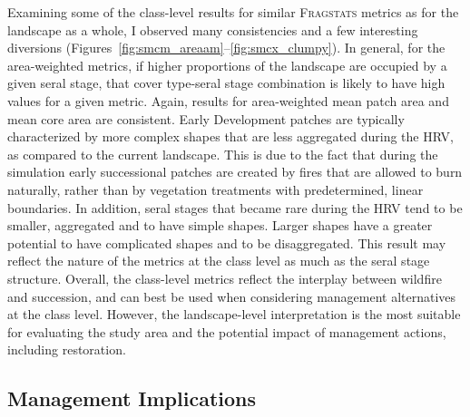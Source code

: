 Examining some of the class-level results for similar \textsc{Fragstats} metrics as for the landscape as a whole, I observed many consistencies and a few interesting diversions (Figures~\ref{fig:smcm_areaam}--\ref{fig:smcx_clumpy}). In general, for the area-weighted metrics, if higher proportions of the landscape are occupied by a given seral stage, that cover type-seral stage combination is likely to have high values for a given metric. Again, results for area-weighted mean patch area and mean core area are consistent. Early Development patches are typically characterized by more complex shapes that are less aggregated during the HRV, as compared to the current landscape. This is due to the fact that during the simulation early successional patches are created by fires that are allowed to burn naturally, rather than by vegetation treatments with predetermined, linear boundaries. In addition, seral stages that became rare during the HRV tend to be smaller, aggregated and to have simple shapes. Larger shapes have a greater potential to have complicated shapes and to be disaggregated. This result may reflect the nature of the metrics at the class level as much as the seral stage structure. Overall, the class-level metrics reflect the interplay between wildfire and succession, and can best be used when considering management alternatives at the class level. However, the landscape-level interpretation is the most suitable for evaluating the study area and the potential impact of management actions, including restoration. 

\clearpage



\clearpage
\subsection{Management Implications}


